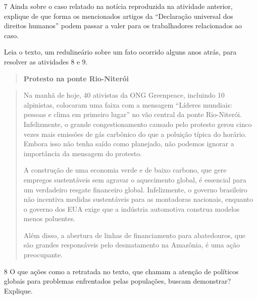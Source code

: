 \num{7} Ainda sobre o caso relatado na notícia reproduzida na atividade
anterior, explique de que forma os mencionados artigos da ``Declaração
universal dos direitos humanos'' podem passar a valer para os
trabalhadores relacionados ao caso.


Leia o texto, um redulineário sobre um fato ocorrido alguns anos atrás,
para resolver as atividades 8 e 9.

\begin{quote}
\textbf{Protesto na ponte Rio-Niterói}
\end{quote}

\begin{quote}
Na manhã de hoje, 40 ativistas da ONG Greenpeace, incluindo 10
alpinistas, colocaram uma faixa com a mensagem ``Líderes mundiais:
pessoas e clima em primeiro lugar'' no vão central da ponte Rio-Niterói.
Infelizmente, o grande congestionamento causado pelo protesto gerou
cinco vezes mais emissões de gás carbônico do que a poluição típica do
horário. Embora isso não tenha saído como planejado, não podemos ignorar
a importância da mensagem do protesto.

A construção de uma economia verde e de baixo carbono, que gere empregos
sustentáveis sem agravar o aquecimento global, é essencial para um
verdadeiro resgate financeiro global. Infelizmente, o governo brasileiro
não incentiva medidas sustentáveis para as montadoras nacionais,
enquanto o governo dos EUA exige que a indústria automotiva construa
modelos menos poluentes.

Além disso, a abertura de linhas de financiamento para abatedouros, que
são grandes responsáveis pelo desmatamento na Amazônia, é uma ação
preocupante.
\end{quote}


\num{8} O que ações como a retratada no texto, que chamam a atenção de
políticos globais para problemas enfrentados pelas populações, buscam
demonstrar? Explique.


